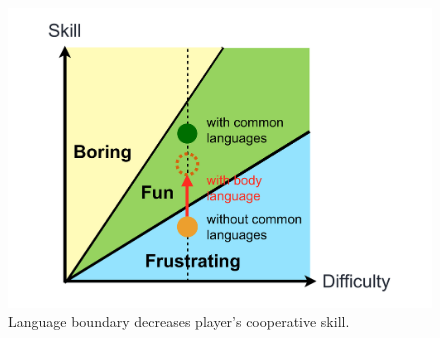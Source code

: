 \begin{figure}[!h]
\centering
\includegraphics[width=0.9\columnwidth]{Figures/GD_F1.pdf}
\caption{Language boundary decreases player's cooperative skill.}
\label{fig:GD_F1}
\end{figure}






